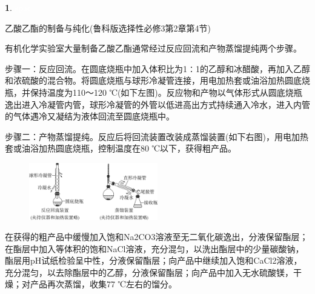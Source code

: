\documentclass[UTF8, 10pt, a4paper, oneside]{ctexart}
\newcommand{\hei}[1]{{\heiti #1}}%
\theoremstyle{definition}
\newtheorem{subexercise}{}[exercise]%
\theoremstyle{remark}
\theoremstyle{plain}
\begin{document}
\begin{subexercise}\textcolor{white}{spac}
    \begin{center}
        \hei{乙酸乙酯的制备与纯化(鲁科版选择性必修3第2章第4节)}
    \end{center}
{\kaishu    
    有机化学实验室大量制备乙酸乙酯通常经过反应回流和产物蒸馏提纯两个步骤。

步骤一：反应回流。在圆底烧瓶中加入体积比为1∶1的乙醇和冰醋酸，再加入乙醇和浓硫酸的混合物。将圆底烧瓶与球形冷凝管连接，用电加热套或油浴加热圆底烧瓶，并保持温度为110～120 ℃(如下左图)。反应物和产物以气体形式从圆底烧瓶逸出进入冷凝管内管，球形冷凝管的外管以低进高出方式持续通入冷水，进入内管的气体遇冷又凝结为液体回流至圆底烧瓶中。

步骤二：产物蒸馏提纯。反应后将回流装置改装成蒸馏装置(如下右图)，用电加热套或油浴加热圆底烧瓶，控制温度在80 ℃以下，获得粗产品。
\begin{figure}[h!]
    \centering
    \includegraphics[width=0.5\textwidth]{assists/image13.png}
\end{figure}

在获得的粗产品中缓慢加入饱和Na2CO3溶液至无二氧化碳逸出，分液保留酯层；在酯层中加入等体积的饱和NaCl溶液，充分混匀，以洗出酯层中的少量碳酸钠，酯层用pH试纸检验呈中性，分液保留酯层；向产品中继续加入饱和CaCl2溶液，充分混匀，以去除酯层中的乙醇，分液保留酯层；向产品中加入无水硫酸镁，干燥；对产品再次蒸馏，收集77 ℃左右的馏分。
}
\end{subexercise}
\end{document}

